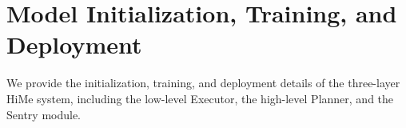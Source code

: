 



\section{Model Initialization, Training, and Deployment}
\label{sec:finetuning_hyperparams}

We provide the initialization, training, and deployment details of the three-layer HiMe system, including the low-level Executor, the high-level Planner, and the Sentry module.

